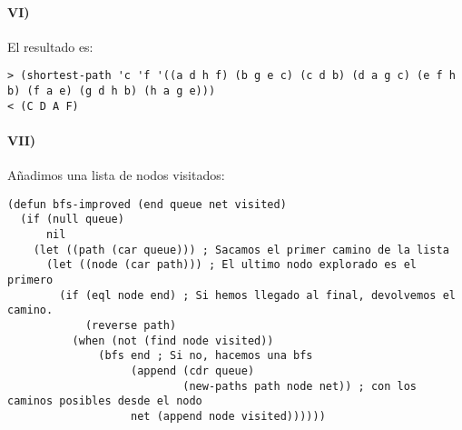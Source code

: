 \documentclass{aitemplate}
\begin{document}
\paragraph{VI)}

El resultado es:

\begin{verbatim}
> (shortest-path 'c 'f '((a d h f) (b g e c) (c d b) (d a g c) (e f h b) (f a e) (g d h b) (h a g e)))
< (C D A F)
\end{verbatim}

\paragraph{VII)}

Añadimos una lista de nodos visitados:

\begin{lstlisting}
(defun bfs-improved (end queue net visited) 
  (if (null queue) 
      nil
    (let ((path (car queue))) ; Sacamos el primer camino de la lista
      (let ((node (car path))) ; El ultimo nodo explorado es el primero
        (if (eql node end) ; Si hemos llegado al final, devolvemos el camino.
            (reverse path)
          (when (not (find node visited))
	          (bfs end ; Si no, hacemos una bfs
	               (append (cdr queue)
	                       (new-paths path node net)) ; con los caminos posibles desde el nodo
	               net (append node visited))))))
\end{lstlisting}
\end{document}
